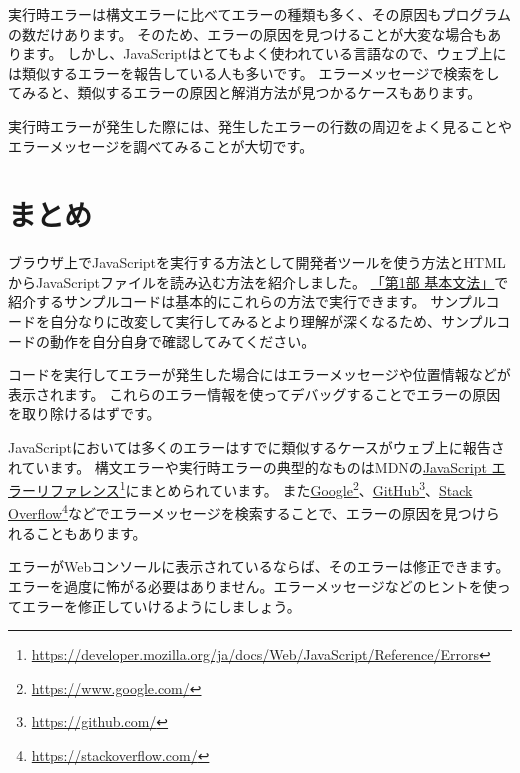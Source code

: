 実行時エラーは構文エラーに比べてエラーの種類も多く、その原因もプログラムの数だけあります。
そのため、エラーの原因を見つけることが大変な場合もあります。
しかし、JavaScriptはとてもよく使われている言語なので、ウェブ上には類似するエラーを報告している人も多いです。
エラーメッセージで検索をしてみると、類似するエラーの原因と解消方法が見つかるケースもあります。

実行時エラーが発生した際には、発生したエラーの行数の周辺をよく見ることやエラーメッセージを調べてみることが大切です。

\hypertarget{conclusion}{%
\section{まとめ}\label{conclusion}}

ブラウザ上でJavaScriptを実行する方法として開発者ツールを使う方法とHTMLからJavaScriptファイルを読み込む方法を紹介しました。
\hyperlink{basic-grammar}{「第1部 基本文法」}で紹介するサンプルコードは基本的にこれらの方法で実行できます。
サンプルコードを自分なりに改変して実行してみるとより理解が深くなるため、サンプルコードの動作を自分自身で確認してみてください。

コードを実行してエラーが発生した場合にはエラーメッセージや位置情報などが表示されます。
これらのエラー情報を使ってデバッグすることでエラーの原因を取り除けるはずです。

JavaScriptにおいては多くのエラーはすでに類似するケースがウェブ上に報告されています。
構文エラーや実行時エラーの典型的なものはMDNの\href{https://developer.mozilla.org/ja/docs/Web/JavaScript/Reference/Errors}{JavaScript
エラーリファレンス}\footnote{\url{https://developer.mozilla.org/ja/docs/Web/JavaScript/Reference/Errors}}にまとめられています。
また\href{https://www.google.com/}{Google}\footnote{\url{https://www.google.com/}}、\href{https://github.com/}{GitHub}\footnote{\url{https://github.com/}}、\href{https://stackoverflow.com/}{Stack
Overflow}\footnote{\url{https://stackoverflow.com/}}などでエラーメッセージを検索することで、エラーの原因を見つけられることもあります。

エラーがWebコンソールに表示されているならば、そのエラーは修正できます。
エラーを過度に怖がる必要はありません。エラーメッセージなどのヒントを使ってエラーを修正していけるようにしましょう。
